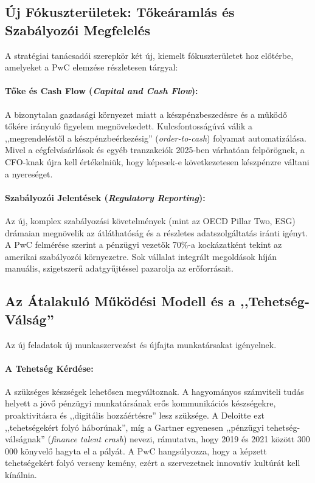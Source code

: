 \subsection{Új Fókuszterületek: Tőkeáramlás és Szabályozói Megfelelés}
\label{ssec:uj_fokuszteruletek}

A stratégiai tanácsadói szerepkör két új, kiemelt fókuszterületet hoz előtérbe, amelyeket a PwC elemzése részletesen tárgyal\cite{PwC-Future-of-Finance}:

\paragraph{Tőke és Cash Flow (\textit{Capital and Cash Flow}):} A bizonytalan gazdasági környezet miatt a készpénzbeszedésre és a működő tőkére irányuló figyelem megnövekedett.
Kulcsfontosságúvá válik a ,,megrendeléstől a készpénzbeérkezésig'' (\textit{order-to-cash}) folyamat automatizálása. Mivel a cégfelvásárlások és egyéb tranzakciók  2025-ben várhatóan felpörögnek, a CFO-knak újra kell értékelniük, hogy képesek-e következetesen készpénzre váltani a nyereséget\cite{PwC-Future-of-Finance}.
\paragraph{Szabályozói Jelentések (\textit{Regulatory Reporting}):} Az új, komplex szabályozási követelmények (mint az OECD Pillar Two, ESG) drámaian megnövelik az átláthatóság és a részletes adatszolgáltatás iránti igényt.
A PwC felmérése szerint a pénzügyi vezetők 70\%-a kockázatként tekint az amerikai szabályozói környezetre\cite{PwC-Future-of-Finance}.
Sok vállalat integrált megoldások híján manuális, szigetszerű adatgyűjtéssel pazarolja az erőforrásait\cite{PwC-Future-of-Finance}.


\subsection{Az Átalakuló Működési Modell és a ,,Tehetség-Válság''}
\label{ssec:mukodesi_modell}

Az új feladatok új munkaszervezést és újfajta munkatársakat igényelnek.
\paragraph{A Tehetség Kérdése:} A szükséges készségek lehetősen megváltoznak. A hagyományos számviteli tudás helyett a jövő pénzügyi munkatársának erős kommunikációs készségekre, proaktivitásra és ,,digitális hozzáértésre'' lesz szüksége.
A Deloitte ezt ,,tehetségekért folyó háborúnak''\cite{Deloitte-Finance-2025}, míg a Gartner egyenesen ,,pénzügyi tehetség-válságnak'' (\textit{finance talent crash}) nevezi\cite{Gartner-Finance-2030}, rámutatva, hogy 2019 és 2021 között 300 000 könyvelő hagyta el a pályát.
A PwC hangsúlyozza, hogy a képzett tehetségekért folyó verseny kemény, ezért a szervezetnek innovatív kultúrát kell kínálnia\cite{PwC-Future-of-Finance}.
